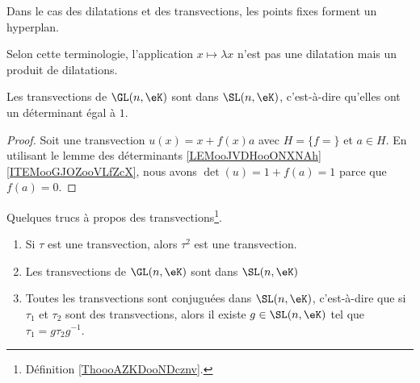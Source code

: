 \begin{normaltext}
	Dans le cas des dilatations et des transvections, les points fixes forment un hyperplan.

	Selon cette terminologie, l'application \( x\mapsto \lambda x\) n'est pas une dilatation mais un produit de dilatations.
\end{normaltext}

\begin{proposition}	\label{PROPooNCKGooTuaYeq}
	Les transvections de \( \GL(n,\eK)\) sont dans \( \SL(n,\eK)\), c'est-à-dire qu'elles ont un déterminant égal à \( 1\).
\end{proposition}

\begin{proof}
	Soit une transvection \( u(x)=x+f(x)a\) avec \( H=\{ f= \}\) et \( a\in H\). En utilisant le lemme des déterminants \ref{LEMooJVDHooONXNAh}\ref{ITEMooGJOZooVLfZcX}, nous avons \( \det(u)=1+f(a)=1\) parce que \( f(a)=0\).
\end{proof}

\begin{lemma}	\label{LEMooYTUSooKqDJce}
	Quelques trucs à propos des transvections\footnote{Définition \ref{ThoooAZKDooNDcznv}.}.
	\begin{enumerate}
		\item		\label{ITEMooOGTOooVGYOUA}
		      Si \( \tau\) est une transvection, alors \( \tau^2\) est une transvection.
		\item		\label{ITEMooCSBVooTWYMvd}
		      Les transvections de \( \GL(n,\eK)\) sont dans \( \SL(n,\eK)\)
		\item		\label{ITEMooYQKNooYCbpBP}
		      Toutes les transvections sont conjuguées dans \( \SL(n,\eK)\), c'est-à-dire que si \( \tau_1\) et \( \tau_2\) sont des transvections, alors il existe \( g\in \SL(n,\eK)\) tel que \( \tau_1=g\tau_2g^{-1}\).
	\end{enumerate}
\end{lemma}

